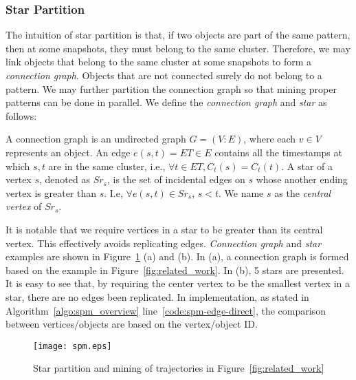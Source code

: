 \subsubsection{Star Partition}
The intuition of star partition is that, if two objects are part of
the same pattern, then at some snapshots, they must belong to the same 
cluster. Therefore, we may link objects that belong to the same cluster
at some snapshots to form a \emph{connection graph}. Objects that are
not connected surely do not belong to a pattern. We may further
partition the connection graph so that mining proper patterns can be
done in parallel. We define the \emph{connection graph} and \emph{star}
as follows:
\begin{definition}
A connection graph is an undirected graph $G=(V:E)$, where 
each $v \in V$ represents an object. An edge $e(s,t)= ET \in E$ 
contains all the timestamps at which $s,t$ are in the same cluster,
i.e., $\forall t \in ET, C_t(s) = C_t(t)$. 
A star of a vertex $s$, denoted as $Sr_s$, is the set of incidental edges on $s$ whose
another ending vertex is greater than $s$. I.e, $\forall e(s,t) \in Sr_s$, $s < t$. We name $s$
as the \emph{central vertex} of $Sr_s$.
\end{definition}

It is notable that we require vertices in a star to be greater than its central vertex. This 
effectively avoids replicating edges. \emph{Connection graph} and \emph{star} examples are 
shown in Figure~\ref{fig:star_partition} (a) and (b). In (a), a connection graph is formed
based on the example in Figure~\ref{fig:related_work}.
In (b), 5 stars are presented. It is easy to see that, by requiring the center vertex to be
the smallest vertex in a star, there are no edges been replicated. In implementation,
as stated in Algorithm~\ref{algo:spm_overview} line~\ref{code:spm-edge-direct}, the
comparison between vertices/objects are based on the vertex/object ID.

\begin{figure}[h]
\centering
\texttt{[image: spm.eps]}
\caption{Star partition and mining of trajectories in Figure~\ref{fig:related_work}}
\label{fig:star_partition}
\end{figure}

